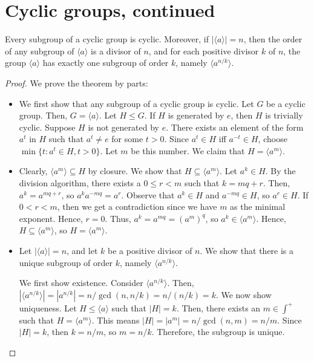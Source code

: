     \section{Cyclic groups, continued}
    \renewcommand{\leftmark}{April 01, 2024}

    \begin{thm}
        Every subgroup of a cyclic group is cyclic. Moreover, if \(|\langle a \rangle| = n\), then the order of any subgroup of \(\langle a \rangle\) is a divisor of \(n\), and for each positive divisor \(k\) of \(n\), the group \(\langle a \rangle\) has exactly one subgroup of order \(k\), namely \(\langle a^{n/k} \rangle\).
    \end{thm}

    \begin{proof}
        We prove the theorem by parts:

        \begin{itemize}
            \item We first show that any subgroup of a cyclic group is cyclic. Let \(G\) be a cyclic group. Then, \(G = \langle a \rangle\). Let \(H \leq G\). If \(H\) is generated by \(e\), then \(H\) is trivially cyclic. Suppose \(H\) is not generated by \(e\). There exists an element of the form \(a^t\) in \(H\) such that \(a^t \neq e\) for some \(t > 0\). Since \(a^t \in H\) iff \(a^{-t} \in H\), choose \(\min \{t : a^t \in H, t > 0\}\). Let \(m\) be this number. We claim that \(H = \langle a^m \rangle\).

            \item Clearly, \(\langle a^m \rangle \subseteq H\) by closure. We show that \(H \subseteq \langle a^m \rangle \). Let \(a^k \in H\). By the division algorithm, there exists a \(0 \leq r < m\) such that \(k = mq + r\). Then, \(a^{k} = a^{mq + r}\), so \(a^{k}a^{-mq} = a^{r}\). Observe that \(a^k \in H\) and \(a^{-mq} \in H\), so \(a^{r} \in H\). If \(0 < r < m\), then we get a contradiction since we have \(m\) as the minimal exponent. Hence, \(r = 0\). Thus, \(a^{k} = a^{mq} = (a^{m})^{q}\), so \(a^{k} \in \langle a^{m}\rangle\). Hence, \(H \subseteq \langle a^{m}\rangle\), so \(H = \langle a^{m}\rangle\).

            \item Let \(|\langle a \rangle| = n\), and let \(k\) be a positive divisor of \(n\). We show that there is a unique subgroup of order \(k\), namely \(\langle a^{n/k} \rangle\).

            We first show existence. Consider \(\langle a^{n/k} \rangle\). Then, \(|\langle a^{n/k}\rangle| = |a^{n/k}| = n/\gcd(n, n/k) = n/(n/k) = k\). We now show uniqueness. Let \(H \leq \langle a\rangle\) such that \(|H| = k\). Then, there exists an \(m\in \int^+\) such that \(H = \langle a^{m}\rangle\). This means \(|H| = |a^m| = n/\gcd(n, m) = n/m\). Since \(|H| = k\), then \(k = n/m\), so \(m = n/k\). Therefore, the subgroup is unique.
        \end{itemize}
    \end{proof}

